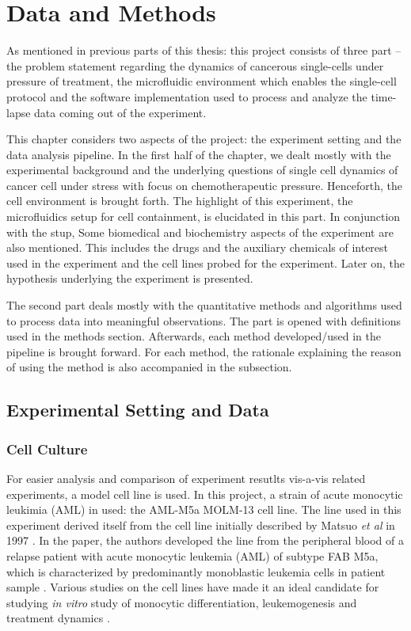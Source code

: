 \documentclass[pdftex,12pt,a4paper]{report}
\begin{document}
\chapter{Data and Methods}

As mentioned in previous parts of this thesis: this project consists of three part -- the problem statement regarding the dynamics of cancerous single-cells under pressure of treatment, the microfluidic environment which enables the single-cell protocol and the software implementation used to process and analyze the time-lapse data coming out of the experiment. 

This chapter considers two aspects of the project: the experiment setting and the data analysis pipeline. In the first half of the chapter, we dealt mostly with the experimental background and the underlying questions of single cell dynamics of cancer cell under stress with focus on chemotherapeutic pressure. Henceforth, the cell environment is brought forth. The highlight of this experiment, the microfluidics setup for cell containment, is elucidated in this part. In conjunction with the stup, Some biomedical and biochemistry aspects of the experiment are also mentioned. This includes the drugs and the auxiliary chemicals of interest used in the experiment and the cell lines probed for the experiment. Later on, the hypothesis underlying the experiment is presented.

The second part deals mostly with the quantitative methods and algorithms used to process data into meaningful observations. The part is opened with definitions used in the methods section. Afterwards, each method developed/used in the pipeline is brought forward. For each method, the rationale explaining the reason of using the method is also accompanied in the subsection.

\section{Experimental Setting and Data}

\subsection{Cell Culture}
\label{subsection:cell_culture}

For easier analysis and comparison of experiment resutlts vis-a-vis related experiments, a model cell line is used. In this project, a strain of acute monocytic leukimia (AML) in used: the AML-M5a MOLM-13 cell line. The line used in this experiment derived itself from the cell line initially described by Matsuo \textit{et al} in 1997 \cite{matsuo1997two}. In the paper, the authors developed the line from the peripheral blood of a relapse patient with acute monocytic leukemia (AML) of subtype FAB M5a, which is characterized by predominantly monoblastic leukemia cells in patient sample \cite{arber20162016}. Various studies on the cell lines have made it an ideal candidate for studying \textit{in vitro} study of monocytic differentiation, leukemogenesis and treatment dynamics \cite{matsuo1997two, kelly2002ct53518}.
\end{document}
